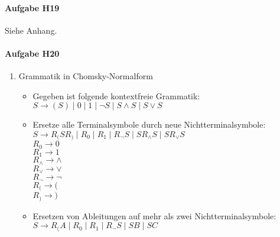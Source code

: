 \documentclass[11pt]{article}
\begin{document}

\paragraph{Aufgabe H19}
Siehe Anhang.

\paragraph{Aufgabe H20}
\begin{enumerate}
\item Grammatik in Chomsky-Normalform
\begin{itemize}
\item  Gegeben ist folgende kontextfreie Grammatik:
\\\hspace*{6mm}$S \rightarrow (S)\mid 0 \mid 1\mid \neg S \mid S \wedge S \mid S \vee S$
\item Ersetze alle Terminalsymbole durch neue Nichtterminalsymbole:
\\\hspace*{6mm} $S \rightarrow R_{(}SR_{)}\mid R_{0} \mid R_{1}\mid R_{\neg} S \mid S R_{\wedge} S \mid S R_{\vee} S$
\\\hspace*{6mm} $R_{0} \rightarrow 0$
\\\hspace*{6mm} $R_{1} \rightarrow 1$
\\\hspace*{6mm} $R_{\wedge} \rightarrow \wedge$
\\\hspace*{6mm} $R_{\vee} \rightarrow \vee$
\\\hspace*{6mm} $R_{\neg} \rightarrow \neg$
\\\hspace*{6mm} $R_{(} \rightarrow ($
\\\hspace*{6mm} $R_{)} \rightarrow )$
\item Ersetzen von Ableitungen auf mehr als zwei Nichtterminalsymbole:
\\\hspace*{6mm} $S \rightarrow R_{(}A\mid R_{0} \mid R_{1}\mid R_{\neg} S \mid S B \mid S C$

\end{itemize}
\end{enumerate}
\end{document}
